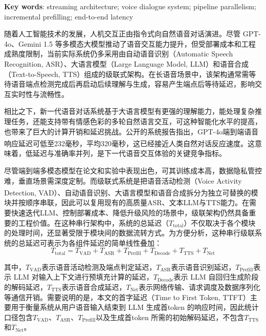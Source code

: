 \documentclass[UTF8,a4paper,zihao=5]{ctexart}
\newcommand{\upcite}[1]{\textsuperscript{\cite{#1}}}
\begin{document}
\noindent\textbf{Key words}: streaming architecture; voice dialogue system; pipeline parallelism; incremental prefilling; end-to-end latency

\vspace{1em}

随着人工智能技术的发展，人机交互正由指令式向自然语音对话演进。尽管 GPT-4o、Gemini 1.5 等多模态大模型推动了语音交互能力提升，但受部署成本和工程成熟度限制，当前实际系统仍多采用由自动语音识别（Automatic Speech Recognition, ASR）、大语言模型（Large Language Model, LLM）和语音合成（Text-to-Speech, TTS）组成的级联式架构。在长语音场景中，该架构通常需等待语音端点检测完成后再启动后续理解与生成，容易产生端点后等待延迟，影响交互实时性与流畅性。

相比之下，新一代语音对话系统基于大语言模型有更强的理解能力，能处理复杂推理任务，还能支持带有情感色彩的多轮自然语言交互，可这种智能化水平的提高，也带来了巨大的计算开销和延迟挑战。公开的系统报告指出，GPT-4o端到端语音响应延迟可低至232毫秒，平均320毫秒\upcite{ref1}，这已经接近人类自然对话反应速度。这意味着，低延迟与准确率并列，是下一代语音交互体验的关键竞争指标。

尽管端到端多模态模型在论文和实验中表现出色，可其训练成本高，数据隐私管控难，垂直场景需深度定制。而级联式系统是把语音活动检测（Voice Activity Detection, VAD）\upcite{ref2}、自动语音识别、大语言模型和语音合成拆分为独立可替换的模块并按顺序串联，因此可以复用现有的高质量ASR、文本LLM与TTS能力。在需要快速迭代LLM、控制部署成本、降低升级风险的场景中，级联架构仍然具备重要的工程价值。在这种串行架构中，系统的总延迟（$T_{\mathrm{total}}$）不仅取决于各个模块的处理时间，还显著受限于模块间的数据流转方式。为方便分析，这种串行级联系统的总延迟可表示为各组件延迟的简单线性叠加：
\begin{equation}
T_{\mathrm{total}} = T_{\mathrm{VAD}} + T_{\mathrm{ASR}} + T_{\mathrm{Prefill}} + T_{\mathrm{Decode}} + T_{\mathrm{TTS}} + T_{\mathrm{Net}}
\end{equation}

其中，$T_{\mathrm{VAD}}$表示语音活动检测及端点判定延迟，$T_{\mathrm{ASR}}$表示语音识别延迟，$T_{\mathrm{Prefill}}$表示 LLM 对输入上下文进行预填充计算的延迟，$T_{\mathrm{Decode}}$表示 LLM 自回归生成阶段的解码延迟，$T_{\mathrm{TTS}}$表示语音合成延迟，$T_{\mathrm{Net}}$表示网络传输、请求调度及数据序列化等通信开销。需要说明的是，本文的首字延迟（Time to First Token, TTFT）主要用于衡量系统从用户语音输入结束到 LLM 生成首token 的响应时间，因此统计口径包含$T_{\mathrm{VAD}}$、$T_{\mathrm{ASR}}$、$T_{\mathrm{Prefill}}$以及生成首token 所需的初始解码延迟，不包含$T_{\mathrm{TTS}}$和$T_{\mathrm{Net}}$。
\end{document}
